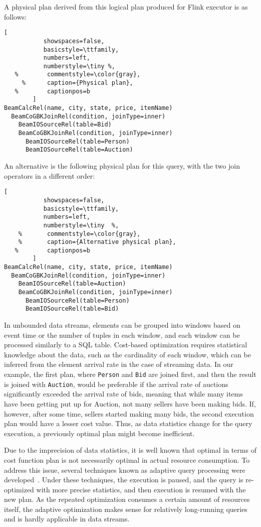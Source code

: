 A physical plan derived from this logical plan produced for Flink executor is as follows:

\begin{lstlisting}[
           showspaces=false,
           basicstyle=\ttfamily,
           numbers=left,
           numberstyle=\tiny %,
   %        commentstyle=\color{gray},
     %      caption={Physical plan}, 
   %        captionpos=b
        ]
BeamCalcRel(name, city, state, price, itemName)
  BeamCoGBKJoinRel(condition, joinType=inner)
    BeamIOSourceRel(table=Bid)
    BeamCoGBKJoinRel(condition, joinType=inner)
      BeamIOSourceRel(table=Person)
      BeamIOSourceRel(table=Auction)
\end{lstlisting}

An alternative is  the following physical plan for this query, with the two join operators in a different order:

\begin{lstlisting}[
           showspaces=false,
           basicstyle=\ttfamily,
           numbers=left,
           numberstyle=\tiny  %,
    %       commentstyle=\color{gray},
    %       caption={Alternative physical plan}, 
   %        captionpos=b
        ]
BeamCalcRel(name, city, state, price, itemName)
  BeamCoGBKJoinRel(condition, joinType=inner)
    BeamIOSourceRel(table=Auction)
    BeamCoGBKJoinRel(condition, joinType=inner)
      BeamIOSourceRel(table=Person)
      BeamIOSourceRel(table=Bid)        
\end{lstlisting}


In unbounded data streams, elements can be grouped into windows based on event time or the number of tuples in each window, and each window can be processed similarly to a SQL table. 
Cost-based optimization requires statistical knowledge about the data, such as the cardinality of each window, which can be inferred from the element arrival rate in the case of streaming data. 
In our example, the first plan, where \texttt{Person} and \texttt{Bid} are joined first, and then the result is joined with \texttt{Auction}, would be preferable if the arrival rate of auctions significantly exceeded the arrival rate of bids, meaning that while many items have been getting put up for Auction, not many sellers have been making bids. 
If, however, after some time, sellers started making many bids, the second execution plan would have a lesser cost value. Thus, as data statistics change for the query execution, a previously optimal plan might become inefficient. 

Due to the imprecision of data statistics, it is well known that optimal in terms of cost function plan is not necessarily optimal in actual resource consumption. To address this issue, several techniques known as adaptive query processing were developed~\cite{deshpande2007adaptive}. Under these techniques, the execution is paused, and the query is re-optimized with more precise statistics, and then execution is resumed with the new plan. As the repeated optimization consumes a certain amount of resources itself, the adaptive optimization makes sense for relatively long-running queries and is hardly applicable in data streams. 

